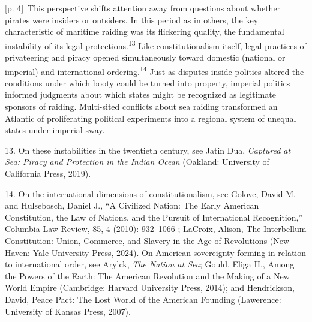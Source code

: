 \documentclass[10pt,a4paper]{article}
\begin{document}
{\scriptsize\color{gray} [p. 4]}\ This perspective shifts attention away from questions about whether pirates were insiders or outsiders. In this period as in others, the key characteristic of maritime raiding was its flickering quality, the fundamental instability of its legal protections.\nobreak\textsuperscript{13} Like constitutionalism itself, legal practices of privateering and piracy opened simultaneously toward domestic (national or imperial) and international ordering.\nobreak\textsuperscript{14} Just as disputes inside polities altered the conditions under which booty could be turned into property, imperial politics informed judgments about which states might be recognized as legitimate sponsors of raiding. Multi-sited conflicts about sea raiding transformed an Atlantic of proliferating political experiments into a regional system of unequal states under imperial sway.\par{\small 13. On these instabilities in the twentieth century, see Jatin Dua, \textit{Captured at Sea: Piracy and Protection in the Indian Ocean} (Oakland: University of California Press, 2019).\par}{\small 14. On the international dimensions of constitutionalism, see Golove, David M. and Hulsebosch, Daniel J., “A Civilized Nation: The Early American Constitution, the Law of Nations, and the Pursuit of International Recognition,” Columbia Law Review, 85, 4 (2010): 932–1066 ; LaCroix, Alison, The Interbellum Constitution: Union, Commerce, and Slavery in the Age of Revolutions (New Haven: Yale University Press, 2024). On American sovereignty forming in relation to international order, see Arylck, \textit{The Nation at Sea}; Gould, Eliga H., Among the Powers of the Earth: The American Revolution and the Making of a New World Empire (Cambridge: Harvard University Press, 2014); and Hendrickson, David, Peace Pact: The Lost World of the American Founding (Lawerence: University of Kansas Press, 2007).\par}
\end{document}
